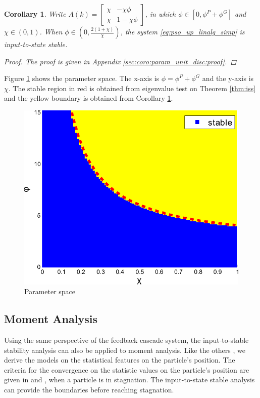 \documentclass{sig-alternate}
\newtheorem{mycoro}{Corollary}
\begin{document}
\begin{mycoro}
\label{coro:param_unit_disc}
Write $ A(k) = 
\begin{bmatrix}
\chi & - \chi \phi \\
\chi & 1 - \chi \phi
\end{bmatrix}
$, in which
$ \phi \in [0,  \phi^{P} + \phi^{G} ] $ and $ \chi \in ( 0, 1 ) $.
When $ \phi \in (0 , \frac{2(1+\chi)}{\chi} ) $, the system \eqref{eq:pso_up_linalg_simp} is input-to-state stable.
\begin{proof}
The proof is given in Appendix \ref{sec:coro:param_unit_disc:proof}.
\end{proof}
\end{mycoro}

Figure \ref{fig:paramSpace} shows the parameter space.
The x-axis is $ \phi = \phi^{P} + \phi^{G} $ and the y-axis is $ \chi $.
The stable region in red is obtained from eigenvalue test on Theorem \ref{thm:iss} and the yellow boundary is obtained from Corollary \ref{coro:param_unit_disc}.
\begin{figure}
\centering
\includegraphics[width=0.7\linewidth]{./param2}
\caption{Parameter space}
\label{fig:paramSpace}
\end{figure}

\subsection{Moment Analysis}
\label{sec:sto_anly}

Using the same perspective of the feedback cascade system, the input-to-stable stability analysis can also be applied to moment analysis.
Like the others \cite{Jiang20078,Poli:2008:DSS:1384929.1384944}, we derive the models on the statistical features on the particle's position.
The criteria for the convergence on the statistic values on the particle's position are given in \cite{Jiang20078} and \cite{Poli:2008:DSS:1384929.1384944}, when a particle is in stagnation.
The input-to-state stable analysis can provide the boundaries before reaching stagnation.
\end{document}
